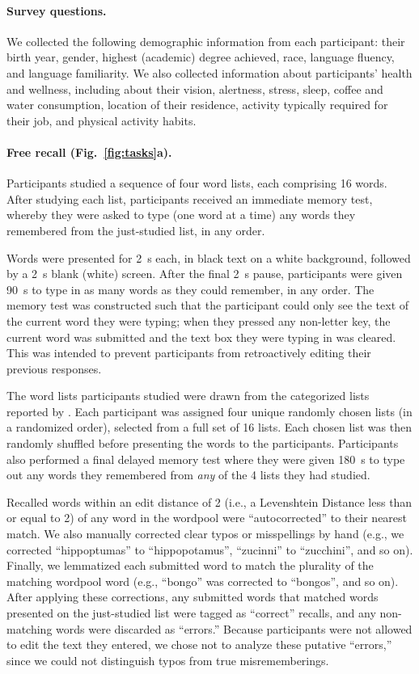 \documentclass[10pt]{article}
\begin{document}
\paragraph*{Survey questions.}  We collected the following demographic
information from each participant: their birth year, gender, highest
(academic) degree achieved, race, language fluency, and language
familiarity.  We also collected information about participants'
health and wellness, including about their vision, alertness, stress, sleep, coffee
and water consumption, location of their residence, activity typically
required for their job, and physical activity habits.


\paragraph*{Free recall (Fig.~\ref{fig:tasks}a).} 
Participants studied a sequence of four word lists, each comprising 16
words.  After studying each list, participants received an immediate
memory test, whereby they were asked to type (one word at a time) any
words they remembered from the just-studied list, in any order.

Words were presented for 2~s each, in black text on a white
background, followed by a 2~s blank (white) screen.  After the final
2~s pause, participants were given 90~s to type in as many words as
they could remember, in any order.  The memory test was constructed
such that the participant could only see the text of the current word
they were typing; when they pressed any non-letter key, the current
word was submitted and the text box they were typing in was cleared.
This was intended to prevent participants from retroactively editing
their previous responses.

The word lists participants studied were drawn from the categorized
lists reported by \cite{ZimaEtal18}.  Each participant was assigned
four unique randomly chosen lists (in a randomized order), selected
from a full set of 16 lists.  Each chosen list was then randomly
shuffled before presenting the words to the participants.
Participants also performed a final delayed memory test where they
were given 180~s to type out any words they remembered from
\textit{any} of the 4 lists they had studied.

Recalled words within an edit distance of 2 (i.e., a Levenshtein Distance less
than or equal to 2) of any word in the wordpool were ``autocorrected''
to their nearest match.  We also manually corrected clear typos or
misspellings by hand (e.g., we corrected ``hippoptumas'' to
``hippopotamus'', ``zucinni'' to ``zucchini'', and so on).  Finally,
we lemmatized each submitted word to match the plurality of the
matching wordpool word (e.g., ``bongo'' was corrected to ``bongos'',
and so on).  After applying these corrections, any submitted words
that matched words presented on the just-studied list were tagged as
``correct'' recalls, and any non-matching words were discarded as
``errors.''  Because participants were not allowed to edit the text
they entered, we chose not to analyze these putative ``errors,'' since
we could not distinguish typos from true misrememberings.
\end{document}
